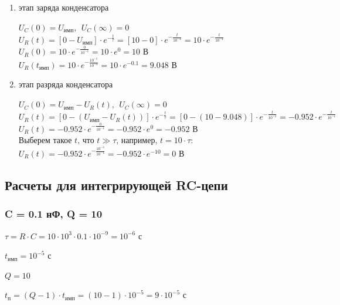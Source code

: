 \begin{enumerate}
\item этап заряда конденсатора

	$U_C(0)	= U_\text{имп},\ \ U_C(\infty) = 0$\\		
	$U_R(t) = [0 - U_\text{имп}] \cdot e^{-\frac{t}{\tau}} = [10 - 0] \cdot e^{-\frac{t}{10^{-4}}} = 10 \cdot e^{-\frac{t}{10^{-4}}}$\\
	$U_R(0) = 10 \cdot e^{-\frac{0}{10^{-4}}} = 10 \cdot e^0 = 10 \text{ В}$\\
	$U_R(t_\text{имп}) = 10 \cdot e^{-\frac{10^{-5}}{10^{-4}}} = 10 \cdot e^{-0.1} = 9.048 \text{ В}$

\item этап разряда конденсатора
	
	$U_C(0)	= U_\text{имп} - U_R(t),\ \ U_C(\infty) = 0$\\
	$U_R(t) = [0 - (U_\text{имп} - U_R(t))] \cdot e^{-\frac{t}{\tau}} = [0 - (10 - 9.048)] \cdot e^{-\frac{t}{10^{-4}}} = -0.952 \cdot e^{-\frac{t}{10^{-4}}}$\\
	$U_R(t) = -0.952 \cdot e^{-\frac{0}{10^{-4}}} = -0.952 \cdot e^0 = -0.952 \text{ В}$\\
	Выберем такое $t$, что $t \gg \tau$, например, $t = 10 \cdot \tau$:\\
	$U_R(t) = -0.952 \cdot e^{-\frac{10^{-3}}{10^{-4}}} = -0.952 \cdot e^{-10} = 0 \text{ В}$
\end{enumerate}

\newpage

\subsection{Расчеты для интегрирующей RC-цепи}

\subsubsection{C = 0.1 нФ, Q = 10}

$\tau = R \cdot C = 10 \cdot 10^3 \cdot 0.1 \cdot 10^{-9} = 10^{-6} \text{ с}$
		
$t_\text{имп} = 10^{-5} \text{ с}$
		
$Q = 10$		
		
$t_\text{п} = (Q - 1) \cdot t_\text{имп} = (10 - 1) \cdot 10^{-5} = 9 \cdot 10^{-5} \text{ с}$
		
